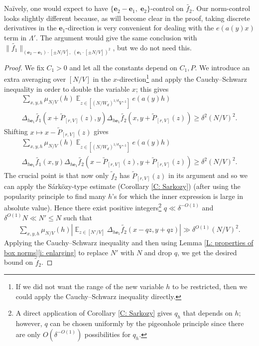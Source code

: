 \documentclass[11pt]{amsart}
\theoremstyle{definition}
\DeclareMathOperator*{\E}{\mathbb{E}}
\newcommand{\be}{{\mathbf{e}}}
\newcommand{\abs}[1]{\mathopen{}\left| #1\mathclose{}\right|}
\begin{document}
Na\"ively, one would expect to have
$\{\be_2-\be_1,\; \be_2\}$-control on $\widetilde{f_2}$.  Our norm-control looks slightly different because, as will become clear in the proof, taking discrete derivatives in the $\be_1$-direction is very convenient for dealing with the $e(a(y)x)$ term in $\Lambda'$. The argument would give the same conclusion with $\|\widetilde{f_1}\|_{(\be_2-\be_1)\cdot [\pm N/V],\; (\be_1\cdot [\pm N/V])^2}$, but we do not need this.

\begin{proof}
     We fix $C_1>0$ and let all the constants depend on $C_1, P$. 
     We introduce an extra averaging over $[N/V]$ in the $x$-direction\footnote{If we did not want the range of the new variable $h$ to be restricted, then we could apply the Cauchy--Schwarz inequality directly.} and apply the Cauchy--Schwarz inequality in order to double the variable $x$; this gives
\begin{multline}\label{E: first CS}
    \sum_{x,y,h}\mu_{N/V}(h)\E_{z \in [(N/W_d)^{1/d}V^{-1}]}
    e(a(y)h)\\ \Delta_{h\be_1}\widetilde{f_1}(x + \widetilde P_{[r, V]}(z), y)\Delta_{h\be_1}\widetilde{f_2}(x, y+ \widetilde P_{[r, V]}(z)) \geq \delta^2 (N/V)^2.
\end{multline}
Shifting $x\mapsto x - \widetilde P_{[r, V]}(z)$ gives
\begin{multline*}
    \sum_{x,y,h}\mu_{N/V}(h)\E_{z \in [(N/W_d)^{1/d}V^{-1}]}
    e(a(y)h)\\ \Delta_{h\be_1}\widetilde{f_1}(x, y)\Delta_{h\be_1}\widetilde{f_2}(x - \widetilde P_{[r, V]}(z), y+ \widetilde P_{[r, V]}(z)) \geq \delta^2 (N/V)^2.
\end{multline*}
The crucial point is that now only $\widetilde f_2$ has $\widetilde P_{[r, V]}(z)$ in its argument and so we can apply the S\'ark\"ozy-type estimate (Corollary \ref{C: Sarkozy}) (after using the popularity principle to find many $h$'s for which the inner expression is large in absolute value). Hence there exist positive integers\footnote{A direct application of Corollary \ref{C: Sarkozy} gives $q_{h}$ that depends on $h$; however, $q$ can be chosen uniformly by the pigeonhole principle since there are only $O(\delta^{-O(1)})$ possibilities for $q_{h}$.} $q\ll \delta^{-O(1)}$ and $\delta^{O(1)} N\ll N'\leq N$ such that
\begin{align*}
    \sum_{x,y,h}\mu_{N/V}(h)\abs{\E_{z\in[N'/V]}\Delta_{h\be_1}\widetilde{f_2}(x - qz, y + qz)} \gg \delta^{O(1)} (N/V)^2.
\end{align*}
Applying the Cauchy--Schwarz inequality and then using Lemma \ref{L: properties of box norms}\eqref{i: enlarging} to replace $N'$ with $N$ and drop $q$, we get the desired bound on $\widetilde f_2$. 
\end{proof}
\end{document}
